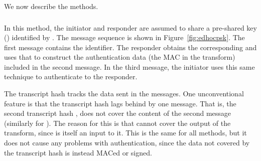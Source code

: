 We now describe the \mEdhoc{} methods.
%
%
%
\spacehack
\subsubsection{\mPskPsk{}}
In this method, the initiator and responder are assumed to share a pre-shared key (\mPsk) identified by \mIDPsk.
%
The message sequence is shown in Figure~\ref{fig:edhocpsk}.
%
The first message contains the \mIDPsk{} identifier.
%
The responder obtains the corresponding \mPsk{} and uses that to construct the authentication data (the MAC in the \mAead{} transform) included in the second message.
%
%
In the third message, the initiator uses this same technique to authenticate to the responder.
%

The transcript hash \mTH{} tracks the data sent in the messages.
%
One unconventional feature is that the transcript hash lags behind by one message. That is, the second transcript hash \mTHtwo{}, does not cover the content of the second message (similarly for \mTHthree). The reason for this is that \mTHtwo{} cannot cover the output of the \mAead{} transform, since \mTHtwo{} is itself an input to it.
%
This is the same for all methods, but it does not cause any problems with authentication, since the data not covered by the transcript hash is instead MACed or signed.
%


